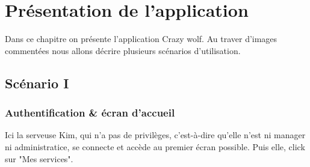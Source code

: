\chapter[L'application]{Présentation de l'application}

Dans ce chapitre on présente l'application Crazy wolf. 
Au traver d'images commentées nous allons décrire plusieurs scénarios
d'utilisation.
\section[Authentification \& écran d'accueil - Scénario I]{Scénario I}
\subsection*{Authentification \& écran d'accueil}
Ici la serveuse Kim, qui n'a pas de privilèges, c'est-à-dire qu'elle n'est 
ni manager ni administratice, se connecte et accède au premier écran possible.
Puis elle, click sur "Mes services".

